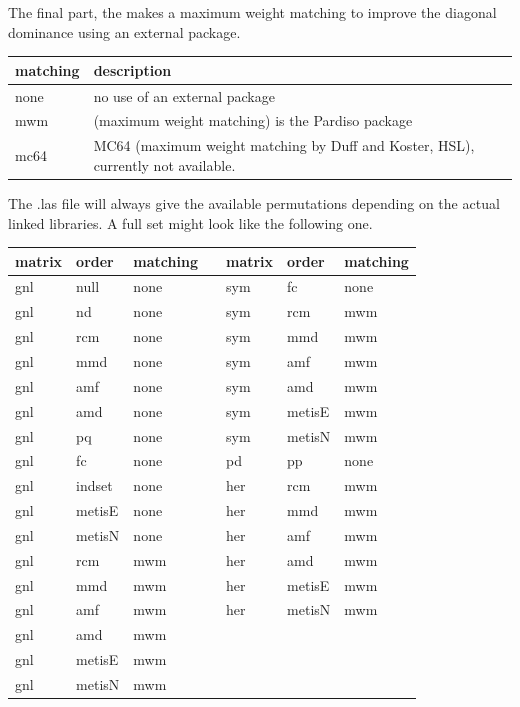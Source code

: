 The final part, the  makes a maximum weight matching to
improve the diagonal dominance using an external package.
\begin{center}
\begin{tabular}{lp{}}
\toprule
matching & description \\
\midrule
none & no use of an external package\\
mwm & (maximum weight matching) is the Pardiso package\\
mc64 & MC64 (maximum weight matching by Duff and Koster, HSL),
   currently not available.\\
\bottomrule
\end{tabular}
\end{center}

The .las file will always give the available permutations depending on the
actual linked libraries. A full set might look like the following one.
\begin{center}
\begin{tabular}{lllllll}
\toprule
matrix & order & matching & & matrix & order & matching \\
\midrule
gnl & null  & none& & sym & fc    & none\\
gnl & nd    & none& & sym & rcm   & mwm \\
gnl & rcm   & none& & sym & mmd   & mwm \\
gnl & mmd   & none& & sym & amf   & mwm \\
gnl & amf   & none& & sym & amd   & mwm \\
gnl & amd   & none& & sym & metisE& mwm \\
gnl & pq    & none& & sym & metisN& mwm \\
gnl & fc    & none& & pd  & pp    & none\\
gnl & indset& none& & her & rcm   & mwm \\
gnl & metisE& none& & her & mmd   & mwm \\
gnl & metisN& none& & her & amf   & mwm \\
gnl & rcm   & mwm & & her & amd   & mwm \\
gnl & mmd   & mwm & & her & metisE& mwm \\
gnl & amf   & mwm & & her & metisN& mwm \\
gnl & amd   & mwm & &\\ 
gnl & metisE& mwm & &\\ 
gnl & metisN& mwm & &\\ 
\bottomrule
\end{tabular}
\end{center}

